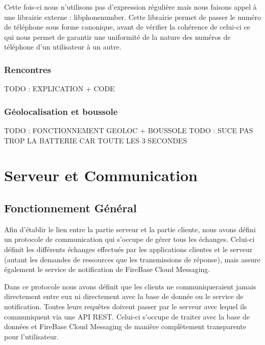 \documentclass[french]{article}
\begin{document}
	Cette fois-ci nous n'utilisons pas d'expression régulière mais nous faisons appel à une librairie externe : libphonenumber.
	Cette librairie permet de passer le numéro de téléphone sous forme canonique, avant de vérifier la cohérence de celui-ci ce qui nous permet de garantir une uniformité de la nature des numéros de téléphone d'un utilisateur à un autre.
	
	 
	
	\subsubsection{Rencontres}
	
	TODO : EXPLICATION + CODE
	
	\subsubsection{Géolocalisation et boussole}
	
	TODO : FONCTIONNEMENT GEOLOC + BOUSSOLE
	TODO : SUCE PAS TROP LA BATTERIE CAR TOUTE LES 3 SECONDES
	
	
	\section{Serveur et Communication}	
	\subsection{Fonctionnement Général}
	
	Afin d'établir le lien entre la partie serveur et la partie cliente, nous avons défini un protocole de communication qui s'occupe de gérer tous les échanges. Celui-ci définit les différents échanges effectués par les applications clientes et le serveur (autant les demandes de ressources que les transmissions de réponse), mais assure également le service de notification de FireBase Cloud Messaging. 
	
	\medbreak
	
	Dans ce protocole nous avons définit que les clients ne communiqueraient jamais directement entre eux ni directement avec la base de donnée ou le service de notification. Toutes leurs requêtes doivent passer par le serveur avec lequel ils communiquent via une API REST. Celui-ci s'occupe de traiter avec la base de données et FireBase Cloud Messaging de manière complètement transparente pour l'utilisateur.
	
\end{document}
